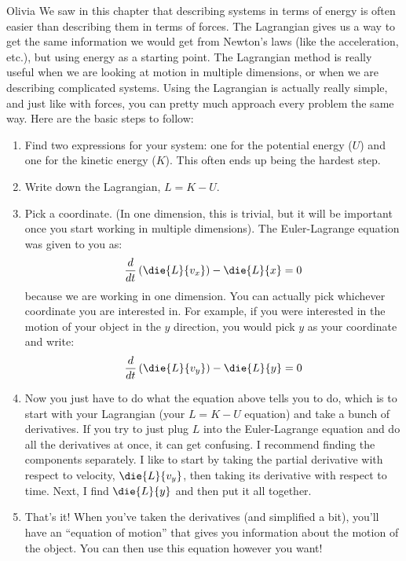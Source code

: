\begin{studentOpinion}{Olivia}
We saw in this chapter that describing systems in terms of energy is often easier than describing them in terms of forces. The Lagrangian gives us a way to get the same information we would get from Newton's laws (like the acceleration, etc.), but using energy as a starting point. The Lagrangian method is really useful when we are looking at motion in multiple dimensions, or when we are describing complicated systems. Using the Lagrangian is actually really simple, and just like with forces, you can pretty much approach every problem the same way. Here are the basic steps to follow:
\begin{enumerate}
\item Find two expressions for your system: one for the potential energy ($U$) and one for the kinetic energy ($K$). This often ends up being the hardest step.
\item Write down the Lagrangian, $L=K-U$.
\item Pick a coordinate. (In one dimension, this is trivial, but it will be important once you start working in multiple dimensions). The Euler-Lagrange equation was given to you as:
\begin{align*}
\frac{d}{dt}\left(\die{L}{v_x}\right)-\die{L}{x} = 0
\end{align*}
because we are working in one dimension. You can actually pick whichever coordinate you are interested in. For example, if you were interested in the motion of your object in the $y$ direction, you would pick $y$ as your coordinate and write:
\begin{align*}
\frac{d}{dt}\left(\die{L}{v_y}\right)-\die{L}{y} = 0
\end{align*}
\item Now you just have to do what the equation above tells you to do, which is to start with your Lagrangian (your $L=K-U$ equation) and take a bunch of derivatives. If you try to just plug $L$ into the Euler-Lagrange equation and do all the derivatives at once, it can get confusing. I recommend finding the components separately. I like to start by taking the partial derivative with respect to velocity, $\die{L}{v_y}$, then taking its derivative with respect to time. Next, I find $\die{L}{y}$ and then put it all together.
\item That's it! When you've taken the derivatives (and simplified a bit), you'll have an ``equation of motion'' that gives you information about the motion of the object. You can then use this equation however you want! 
\end{enumerate}
\end{studentOpinion}

